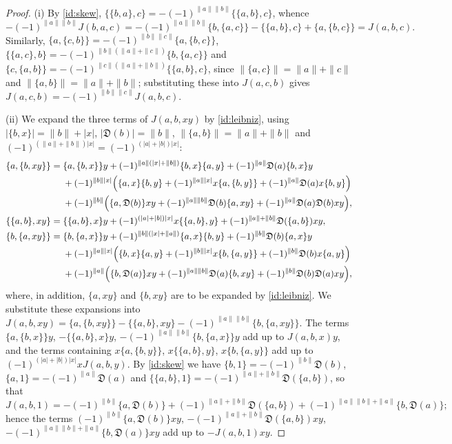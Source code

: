 \documentclass[11pt,reqno]{amsart}
\newcommand{\D}{\mathfrak D}
\newcommand{\rp}[1]{\|#1\|}
\theoremstyle{plain}
\theoremstyle{definition}
\theoremstyle{remark}
\begin{document}
\begin{proof}
(i) By \eqref{id:skew}, $\{\{b,a\},c\}=-(-1)^{\rp a\rp b}\{\{a,b\},c\}$, whence
$$
-(-1)^{\rp a\rp b}J(b,a,c)=-(-1)^{\rp a\rp b}\{b,\{a,c\}\}-\{\{a,b\},c\}+\{a,\{b,c\}\}=J(a,b,c).
$$
Similarly, $\{a,\{c,b\}\}=-(-1)^{\rp b\rp c}\{a,\{b,c\}\}$, $\{\{a,c\},b\}=-(-1)^{\rp b(\rp a+\rp c)}\{b,\{a,c\}\}$ and $\{c,\{a,b\}\}=-(-1)^{\rp c(\rp a+\rp b)}\{\{a,b\},c\}$, since $\rp{\{a,c\}}=\rp a+\rp c$ and $\rp{\{a,b\}}=\rp a+\rp b$; substituting these into $J(a,c,b)$ gives $J(a,c,b)=-(-1)^{\rp b\rp c}J(a,b,c)$.

(ii) We expand the three terms of $J(a,b,xy)$ by \eqref{id:leibniz}, using $|\{b,x\}|=\rp b+|x|$, $|\D(b)|=\rp b$, $\rp{\{a,b\}}=\rp a+\rp b$ and $(-1)^{(\rp a+\rp b)|x|}=(-1)^{(|a|+|b|)|x|}$:
\begin{align*}
\{a,\{b,xy\}\}={}&\{a,\{b,x\}\}y+(-1)^{\rp a(|x|+\rp b)}\{b,x\}\{a,y\}+(-1)^{\rp a}\D(a)\{b,x\}y\\
&+(-1)^{\rp b|x|}\Bigl(\{a,x\}\{b,y\}+(-1)^{\rp a|x|}x\{a,\{b,y\}\}+(-1)^{\rp a}\D(a)x\{b,y\}\Bigr)\\
&+(-1)^{\rp b}\Bigl(\{a,\D(b)\}xy+(-1)^{\rp a\rp b}\D(b)\{a,xy\}+(-1)^{\rp a}\D(a)\D(b)xy\Bigr),\\
\{\{a,b\},xy\}={}&\{\{a,b\},x\}y+(-1)^{(|a|+|b|)|x|}x\{\{a,b\},y\}+(-1)^{\rp a+\rp b}\D(\{a,b\})xy,\\
\{b,\{a,xy\}\}={}&\{b,\{a,x\}\}y+(-1)^{\rp b(|x|+\rp a)}\{a,x\}\{b,y\}+(-1)^{\rp b}\D(b)\{a,x\}y\\
&+(-1)^{\rp a|x|}\Bigl(\{b,x\}\{a,y\}+(-1)^{\rp b|x|}x\{b,\{a,y\}\}+(-1)^{\rp b}\D(b)x\{a,y\}\Bigr)\\
&+(-1)^{\rp a}\Bigl(\{b,\D(a)\}xy+(-1)^{\rp a\rp b}\D(a)\{b,xy\}+(-1)^{\rp b}\D(b)\D(a)xy\Bigr),
\end{align*}
where, in addition, $\{a,xy\}$ and $\{b,xy\}$ are to be expanded by \eqref{id:leibniz}.
We substitute these expansions into $J(a,b,xy)=\{a,\{b,xy\}\}-\{\{a,b\},xy\}-(-1)^{\rp a\rp b}\{b,\{a,xy\}\}$.
The terms $\{a,\{b,x\}\}y$, $-\{\{a,b\},x\}y$, $-(-1)^{\rp a\rp b}\{b,\{a,x\}\}y$ add up to $J(a,b,x)y$, and the terms containing $x\{a,\{b,y\}\}$, $x\{\{a,b\},y\}$, $x\{b,\{a,y\}\}$ add up to $(-1)^{(|a|+|b|)|x|}xJ(a,b,y)$.
By \eqref{id:skew} we have $\{b,1\}=-(-1)^{\rp b}\D(b)$, $\{a,1\}=-(-1)^{\rp a}\D(a)$ and $\{\{a,b\},1\}=-(-1)^{\rp a+\rp b}\D(\{a,b\})$, so that
$$
J(a,b,1)=-(-1)^{\rp b}\{a,\D(b)\}+(-1)^{\rp a+\rp b}\D(\{a,b\})+(-1)^{\rp a\rp b+\rp a}\{b,\D(a)\};
$$
hence the terms $(-1)^{\rp b}\{a,\D(b)\}xy$, $-(-1)^{\rp a+\rp b}\D(\{a,b\})xy$, $-(-1)^{\rp a\rp b+\rp a}\{b,\D(a)\}xy$ add up to $-J(a,b,1)xy$.

\end{proof}
\end{document}
